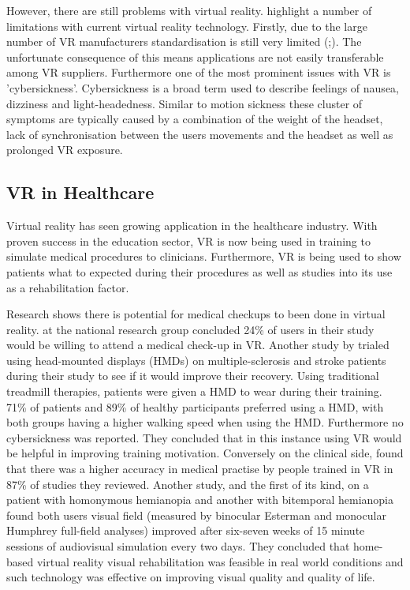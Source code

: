 \documentclass{l4proj}
\begin{document}
However, there are still problems with virtual reality. \citet{HamadJia2022VRChanges} highlight a number of limitations with current virtual reality technology. Firstly, due to the large number of VR manufacturers standardisation is still very limited (\citet{Timmerer2017ImmersiveMedia};\citet{HamadJia2022VRChanges}). The unfortunate consequence of this means applications are not easily transferable among VR suppliers. Furthermore one of the most prominent issues with VR is 'cybersickness'. Cybersickness is a broad term used to describe feelings of nausea, dizziness and light-headedness. Similar to motion sickness these cluster of symptoms are typically caused by a combination of the weight of the headset, lack of synchronisation between the users movements and the headset as well as prolonged VR exposure. 

\subsection{VR in Healthcare}
Virtual reality has seen growing application in the healthcare industry. With proven success in the education sector, VR is now being used in training to simulate medical procedures to clinicians. Furthermore, VR is being used to show patients what to expected during their procedures as well as studies into its use as a rehabilitation factor.

Research shows there is potential for medical checkups to been done in virtual reality. \citet{beyondreality2022} at the national research group concluded 24\% of users in their study would be willing to attend a medical check-up in VR. Another study by \citet{Winter2021} trialed using head-mounted displays (HMDs)  on multiple-sclerosis and stroke patients during their study to see if it would improve their recovery. Using traditional treadmill therapies, patients were given a HMD to wear during their training. 71\% of patients and 89\% of healthy participants preferred using a HMD, with both groups having a higher walking speed when using the HMD. Furthermore no cybersickness was reported. They concluded that in this instance using VR would be helpful in improving training motivation. Conversely on the clinical side, \citet{Samadbeik2018ApplicationsVR} found that there was a higher accuracy in medical practise by people trained in VR in 87\% of studies they reviewed. Another study, and the first of its kind, on a patient with homonymous hemianopia and another with bitemporal hemianopia found both users visual field (measured by binocular Esterman and monocular Humphrey full-field analyses) improved after six-seven weeks of 15 minute sessions of audiovisual simulation every two days. They concluded that home-based virtual reality visual rehabilitation was feasible in real world conditions and such technology was effective on improving visual quality and quality of life.
\end{document}
